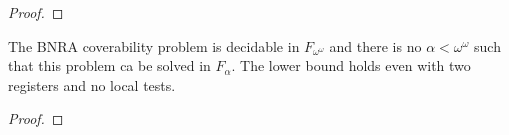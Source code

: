 \ifproofs
\begin{proof}
\end{proof}
\fi
%





\begin{theorem}
	The BNRA coverability problem is decidable in $F_{\omega^\omega}$ and there is no $\alpha < \omega^\omega$ such that this problem ca be solved in $F_{\alpha}$.
	The lower bound holds even with two registers and no local tests.
\end{theorem}

\ifproofs
\begin{proof}
\end{proof}
\fi

